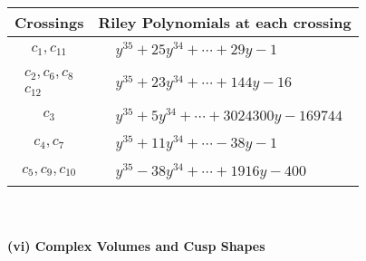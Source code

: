 \documentclass[1p]{elsarticle_modified}
\theoremstyle{definition}
\begin{document}
\begin{tabular}{m{50pt}|m{274pt}}
Crossings & \hspace{64pt}Riley Polynomials at each crossing \\
\hline $$\begin{aligned}c_{1},c_{11}\end{aligned}$$&$\begin{aligned}
&y^{35}+25 y^{34}+\cdots+29 y-1
\end{aligned}$\\
\hline $$\begin{aligned}c_{2},c_{6},c_{8}\\c_{12}\end{aligned}$$&$\begin{aligned}
&y^{35}+23 y^{34}+\cdots+144 y-16
\end{aligned}$\\
\hline $$\begin{aligned}c_{3}\end{aligned}$$&$\begin{aligned}
&y^{35}+5 y^{34}+\cdots+3024300 y-169744
\end{aligned}$\\
\hline $$\begin{aligned}c_{4},c_{7}\end{aligned}$$&$\begin{aligned}
&y^{35}+11 y^{34}+\cdots-38 y-1
\end{aligned}$\\
\hline $$\begin{aligned}c_{5},c_{9},c_{10}\end{aligned}$$&$\begin{aligned}
&y^{35}-38 y^{34}+\cdots+1916 y-400
\end{aligned}$\\
\hline
\end{tabular}\\~\\
\newpage\flushleft \textbf{(vi) Complex Volumes and Cusp Shapes}
\end{document}
